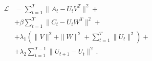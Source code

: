 \documentclass{minimal}
\begin{document}
\fontsize{18}{12}\selectfont
\begin{align*}
    \mathcal{L} &= \sum_{t=1}^T \|A_t - U_t V^T\|^2 + \\
    &+ \beta \sum_{t=1}^T \| C_t -
U_t W^T\|^2 +\\
&+ \lambda_1 \left( \|V\|^2 + \|W\|^2 + \sum_{t=1}^T \|U_t\|^2\right) +\\
&+  \lambda_2 \sum_{t=1}^{T-1} \| U_{t+1} - U_{t}\|^2\,\text{.}
\end{align*}\label{eq:enhanced-model}
\end{document}
